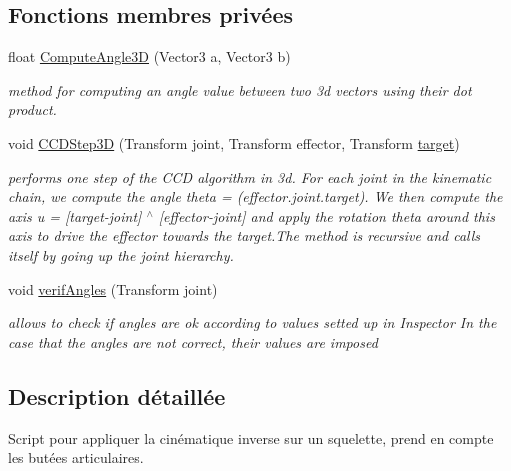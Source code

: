 \subsection*{Fonctions membres privées}
\begin{DoxyCompactItemize}
\item 
float \hyperlink{class_c_c_d3d_a921e61de2ab1ce035bd7ebf1d7e7e1a1}{Compute\+Angle3\+D} (Vector3 a, Vector3 b)
\begin{DoxyCompactList}\small\item\em method for computing an angle value between two 3d vectors using their dot product. \end{DoxyCompactList}\item 
void \hyperlink{class_c_c_d3d_a683157309588f0981bd0c6387260f9ca}{C\+C\+D\+Step3\+D} (Transform joint, Transform effector, Transform \hyperlink{class_c_c_d3d_a8a24b37582e07ee23646b165d54fa600}{target})
\begin{DoxyCompactList}\small\item\em performs one step of the C\+C\+D algorithm in 3d. For each joint in the kinematic chain, we compute the angle theta = (effector.\+joint.\+target). We then compute the axis u = \mbox{[}target-\/joint\mbox{]} $^\wedge$ \mbox{[}effector-\/joint\mbox{]} and apply the rotation theta around this axis to drive the effector towards the target.\+The method is recursive and calls itself by going up the joint hierarchy. \end{DoxyCompactList}\item 
void \hyperlink{class_c_c_d3d_a9b67671b0dc9adb1577328732185447a}{verif\+Angles} (Transform joint)
\begin{DoxyCompactList}\small\item\em allows to check if angles are ok according to values setted up in Inspector In the case that the angles are not correct, their values are imposed \end{DoxyCompactList}\end{DoxyCompactItemize}


\subsection{Description détaillée}
Script pour appliquer la cinématique inverse sur un squelette, prend en compte les butées articulaires. 

